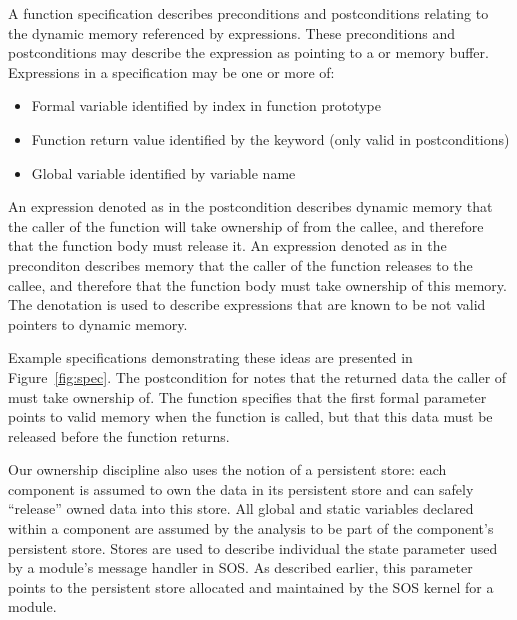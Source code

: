A function specification describes preconditions and postconditions relating
to the dynamic memory referenced by expressions.
%
These preconditions and postconditions may describe the expression as
pointing to a  or  memory buffer.
%
Expressions in a specification may be one or more of: 
%
\begin{itemize}
%
\item Formal variable identified by index in function prototype
%
\item Function return value identified by the keyword  (only
valid in postconditions)
%
\item Global variable identified by variable name
%
\end{itemize}
%
An expression denoted as  in the postcondition describes dynamic
memory that the caller of the function will take ownership of from the
callee, and therefore that the function body must release it.
%
An expression denoted as  in the preconditon describes memory
that the caller of the function releases to the callee, and therefore that
the function body must take ownership of this memory.
%
The  denotation is used to describe expressions that are known to
be not valid pointers to dynamic memory.



Example specifications demonstrating these ideas are presented in 
Figure~\ref{fig:spec}.
%
The postcondition for  notes that the returned data the
caller of  must take ownership of.
%
The  function specifies that the first formal parameter
points to valid memory when the function is called, but that this data must
be released before the function returns.



%
Our ownership discipline also uses the notion of a persistent store:  each
component is assumed to own the data in its persistent store and can safely
``release'' owned data into this store.
%
All global and static variables declared within a component are assumed by
the analysis to be part of the component's persistent store.
%
Stores are used to describe individual the state parameter used by a
module's message handler in SOS.
%
As described earlier, this parameter points to the persistent store
allocated and maintained by the SOS kernel for a module.



